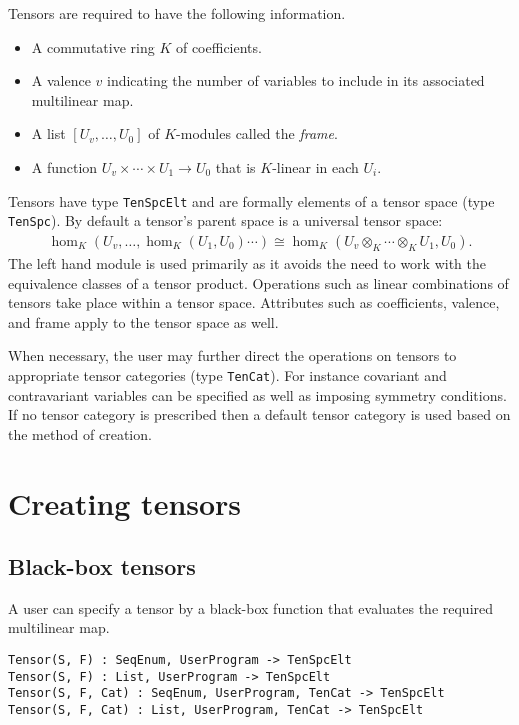 
Tensors are required to have the following information.
\begin{itemize}
\item A commutative ring $K$ of coefficients.
\item A valence $v$ indicating the number of variables to include in its 
associated multilinear map.
\item A list $[U_v,\dots, U_0]$ of $K$-modules called the {\em frame}.
\item A function $U_v\times \cdots \times U_1\to U_0$ that is $K$-linear in 
each $U_i$.
\end{itemize}
Tensors have type {\tt TenSpcElt} and are formally elements of a tensor space 
(type {\tt TenSpc}).  By default a tensor's parent space is a universal tensor space:
\begin{align*}
	\hom_K(U_v,\dots,\hom_K(U_1,U_0)\cdots) \cong \hom_K(U_v\otimes_K\cdots \otimes_K U_1,U_0).
\end{align*}
The left hand module is used primarily as it avoids the need to work with 
the equivalence classes of a tensor product.
Operations such as linear combinations of tensors take place within a  
tensor space.
Attributes such as coefficients, valence, and frame  apply to the tensor space 
as well.

When necessary, the user may further direct the operations on tensors to 
appropriate tensor categories 
(type {\tt TenCat}).  For instance covariant and contravariant variables can 
be specified
as well as imposing symmetry conditions.  If no tensor category is prescribed
then a default tensor category is used based on the method of creation.
\medskip

\minitoc

\section{Creating tensors}

\subsection{Black-box tensors}
A user can specify a tensor by a black-box function that 
evaluates the required
multilinear map.

\color{blue}
{\small \begin{verbatim}
Tensor(S, F) : SeqEnum, UserProgram -> TenSpcElt
Tensor(S, F) : List, UserProgram -> TenSpcElt
Tensor(S, F, Cat) : SeqEnum, UserProgram, TenCat -> TenSpcElt
Tensor(S, F, Cat) : List, UserProgram, TenCat -> TenSpcElt
\end{verbatim} }
\color{black}

